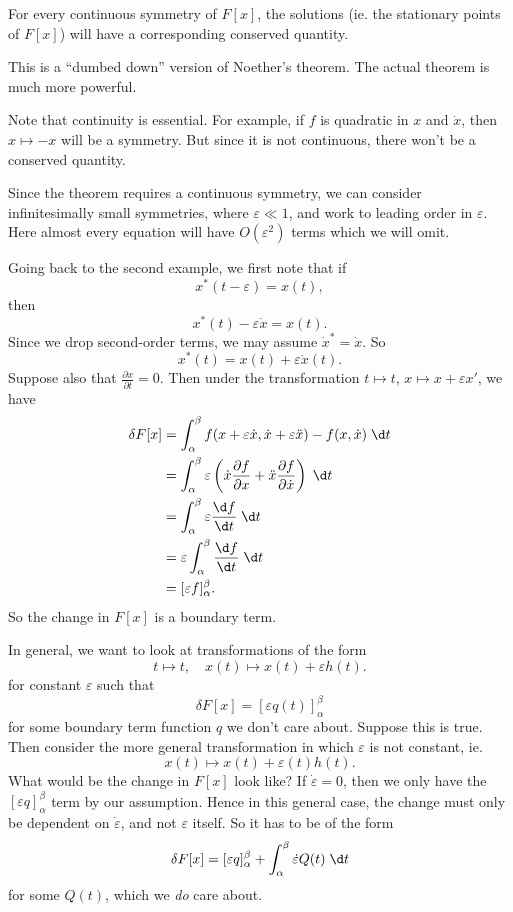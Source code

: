 \documentclass[a4paper]{article}
\begin{document}
\begin{thm}
  For every continuous symmetry of $F[x]$, the solutions (ie. the stationary points of $F[x]$) will have a corresponding conserved quantity.

  \note This is a ``dumbed down'' version of Noether's theorem. The actual theorem is much more powerful.
\end{thm}
Note that continuity is essential. For example, if $f$ is quadratic in $x$ and $\dot{x}$, then $x\mapsto -x$ will be a symmetry. But since it is not continuous, there won't be a conserved quantity.

Since the theorem requires a continuous symmetry,  we can consider infinitesimally small symmetries, where $\varepsilon \ll 1$, and work to leading order in $\varepsilon$. Here almost every equation will have $O(\varepsilon^2)$ terms which we will omit.

Going back to the second example, we first note that if
\[
  x^*(t - \varepsilon) = x(t),
\]
then
\[
  x^*(t) - \varepsilon\dot{x} = x(t).
\]
Since we drop second-order terms, we may assume $\dot{x}^* = \dot{x}$. So
\[
  x^*(t) = x(t) + \varepsilon \dot{x}(t).
\]
Suppose also that $\frac{\partial x}{\partial t} = 0$. Then under the transformation $t \mapsto t$, $x \mapsto x + \varepsilon x'$, we have
\begin{align*}
  \delta F[x] &= \int_\alpha^\beta f(x + \varepsilon \dot{x}, \dot{x} + \varepsilon \ddot{x}) - f(x, \dot{x})\;\d t\\
  &= \int_\alpha^\beta \varepsilon\left(\dot{x}\frac{\partial f}{\partial x} + \ddot{x} \frac{\partial f}{\partial \dot{x}}\right)\;\d t\\
  &= \int_\alpha^\beta \varepsilon\frac{\d f}{\d t}\;\d t\\
  &= \varepsilon\int_\alpha^\beta \frac{\d f}{\d t}\;\d t \\
  &= [\varepsilon f]_\alpha^\beta.
\end{align*}
So the change in $F[x]$ is a boundary term.

In general, we want to look at transformations of the form
\[
  t \mapsto t,\quad x(t) \mapsto x(t) + \varepsilon h(t).
\]
for constant $\varepsilon$ such that 
\[
  \delta F[x] = [\varepsilon q(t)]_\alpha^\beta
\]
for some boundary term function $q$ we don't care about. Suppose this is true. Then consider the more general transformation in which $\varepsilon$ is not constant, ie.
\[
  x(t) \mapsto x(t) + \varepsilon(t)h(t).
\]
What would be the change in $F[x]$ look like? If $\dot{\varepsilon} = 0$, then we only have the $[\varepsilon q]_\alpha^\beta$ term by our assumption. Hence in this general case, the change must only be dependent on $\dot{\varepsilon}$, and not $\varepsilon$ itself. So it has to be of the form
\[
  \delta F[x] = [\varepsilon q]_\alpha^\beta + \int_\alpha^\beta \dot{\varepsilon} Q(t)\;\d t
\]
for some $Q(t)$, which we \emph{do} care about.
\end{document}
